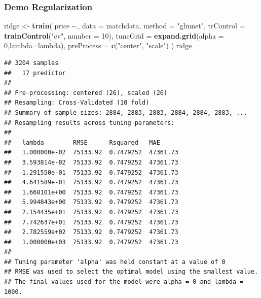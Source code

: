 \documentclass[
  shownotes,
  xcolor={svgnames},
  hyperref={colorlinks,citecolor=DarkBlue,linkcolor=DarkRed,urlcolor=DarkBlue}
  ]{beamer}
\newenvironment{Shaded}{\begin{snugshade}}{\end{snugshade}}
\newcommand{\DataTypeTok}[1]{\textcolor[rgb]{0.13,0.29,0.53}{#1}}
\newcommand{\DecValTok}[1]{\textcolor[rgb]{0.00,0.00,0.81}{#1}}
\newcommand{\KeywordTok}[1]{\textcolor[rgb]{0.13,0.29,0.53}{\textbf{#1}}}
\newcommand{\NormalTok}[1]{#1}
\newcommand{\OperatorTok}[1]{\textcolor[rgb]{0.81,0.36,0.00}{\textbf{#1}}}
\newcommand{\StringTok}[1]{\textcolor[rgb]{0.31,0.60,0.02}{#1}}
\begin{document}
\begin{frame}[fragile]
\frametitle{Demo Regularization}

\begin{tiny}
\begin{Shaded}
\begin{Highlighting}[]
\NormalTok{ridge \textless{}{-}}\StringTok{ }\KeywordTok{train}\NormalTok{(}
\NormalTok{  price }\OperatorTok{\textasciitilde{}}\NormalTok{., }\DataTypeTok{data =}\NormalTok{ matchdata, }\DataTypeTok{method =} \StringTok{"glmnet"}\NormalTok{,}
  \DataTypeTok{trControl =} \KeywordTok{trainControl}\NormalTok{(}\StringTok{"cv"}\NormalTok{, }\DataTypeTok{number =} \DecValTok{10}\NormalTok{),}
  \DataTypeTok{tuneGrid =} \KeywordTok{expand.grid}\NormalTok{(}\DataTypeTok{alpha =} \DecValTok{0}\NormalTok{,}\DataTypeTok{lambda=}\NormalTok{lambda), }\DataTypeTok{preProcess =} \KeywordTok{c}\NormalTok{(}\StringTok{"center"}\NormalTok{, }\StringTok{"scale"}\NormalTok{)}
\NormalTok{  )}
\NormalTok{ridge}
\end{Highlighting}
\end{Shaded}
\end{tiny}
\begin{tiny}
\begin{verbatim}
## 3204 samples
##   17 predictor
## 
## Pre-processing: centered (26), scaled (26) 
## Resampling: Cross-Validated (10 fold) 
## Summary of sample sizes: 2884, 2883, 2883, 2884, 2884, 2883, ... 
## Resampling results across tuning parameters:
## 
##   lambda        RMSE      Rsquared   MAE     
##   1.000000e-02  75133.92  0.7479252  47361.73
##   3.593814e-02  75133.92  0.7479252  47361.73
##   1.291550e-01  75133.92  0.7479252  47361.73
##   4.641589e-01  75133.92  0.7479252  47361.73
##   1.668101e+00  75133.92  0.7479252  47361.73
##   5.994843e+00  75133.92  0.7479252  47361.73
##   2.154435e+01  75133.92  0.7479252  47361.73
##   7.742637e+01  75133.92  0.7479252  47361.73
##   2.782559e+02  75133.92  0.7479252  47361.73
##   1.000000e+03  75133.92  0.7479252  47361.73
## 
## Tuning parameter 'alpha' was held constant at a value of 0
## RMSE was used to select the optimal model using the smallest value.
## The final values used for the model were alpha = 0 and lambda = 1000.
\end{verbatim}
\end{tiny}
\end{frame}
\end{document}
